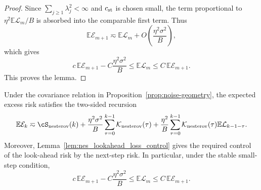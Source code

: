 \documentclass[11pt]{article}
\newcommand{\nesterov}{\mathrm{nesterov}}
\begin{document}
\begin{proof}
Since \(\sum_{j\ge1}\lambda_j^2<\infty\) and \(c_{\rm st}\) is chosen small, the term proportional to \(\eta^2\mathbb{E}\mathcal L_m/B\) is absorbed into the comparable first term.  Thus
\[
    \mathbb{E}\mathcal E_{m+1}
    \eqsim
    \mathbb{E}\mathcal L_m
    +O\left(\frac{\eta^2\sigma^2}{B}\right),
\]
which gives
\[
    c\,\mathbb{E}\mathcal E_{m+1}-C\frac{\eta^2\sigma^2}{B}
    \le
    \mathbb{E}\mathcal L_m
    \le
    C\,\mathbb{E}\mathcal E_{m+1}.
\]
This proves the lemma.
\end{proof}

\begin{proposition}
\label{prop:nes_risk_recursion}
Under the covariance relation in Proposition~\ref{prop:noise-geometry}, the expected excess risk satisfies the two-sided
recursion
\begin{equation}
\label{eq:nes_risk_recursion_form}
    \mathbb{E}\mathcal E_k
    \eqsim
    \cS_{\nesterov}(k)
    +
    \frac{\eta^2\sigma^2}{B}\sum_{\tau=0}^{k-1}\mathcal K_{\nesterov}(\tau)
    +
    \frac{\eta^2}{B}\sum_{\tau=0}^{k-1}\mathcal K_{\nesterov}(\tau)
    \mathbb{E}\mathcal L_{k-1-\tau}.
\end{equation}
Moreover, Lemma~\ref{lem:nes_lookahead_loss_control} gives the required control of the look-ahead risk by the
next-step risk.  In particular, under the stable small-step condition,
\[
    c\,\mathbb{E}\mathcal E_{m+1}-C\frac{\eta^2\sigma^2}{B}
    \le
    \mathbb{E}\mathcal L_m
    \le
    C\,\mathbb{E}\mathcal E_{m+1}.
\]
\end{proposition}
\end{document}
